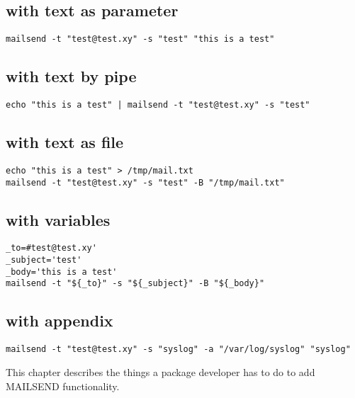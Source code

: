 
 
\subsection { with text as parameter}
\begin{verbatim}
mailsend -t "test@test.xy" -s "test" "this is a test"
\end{verbatim}

\subsection { with text by pipe}
\begin{verbatim}
echo "this is a test" | mailsend -t "test@test.xy" -s "test"
\end{verbatim}

\subsection { with text as file}
\begin{verbatim}
echo "this is a test" > /tmp/mail.txt
mailsend -t "test@test.xy" -s "test" -B "/tmp/mail.txt"
\end{verbatim}

\subsection { with variables}
\begin{verbatim}
_to=#test@test.xy'
_subject='test'
_body='this is a test'
mailsend -t "${_to}" -s "${_subject}" -B "${_body}"
\end{verbatim}

\subsection { with appendix}
\begin{verbatim}
mailsend -t "test@test.xy" -s "syslog" -a "/var/log/syslog" "syslog"
\end{verbatim}

    This chapter describes the things a package developer has to do
    to add MAILSEND functionality.
 
